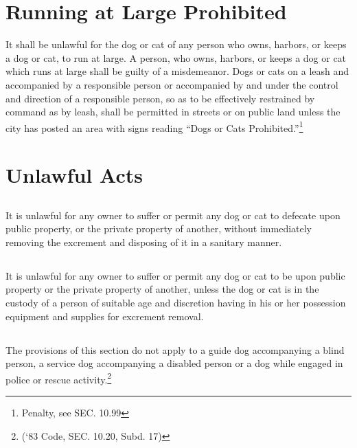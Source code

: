 \section{Running at Large Prohibited}
It shall be unlawful for the dog or cat of any person who owns, harbors, or keeps a dog or cat, to run at large.  A person, who owns, harbors, or keeps a dog or cat which runs at large shall be guilty of a misdemeanor.  Dogs or cats on a leash and accompanied by a responsible person or accompanied by and under the control and direction of a responsible person, so as to be effectively restrained by command as by leash, shall be permitted in streets or on public land unless the city has posted an area with signs reading “Dogs or Cats Prohibited.”\footnote{Penalty, see SEC. 10.99}

\section{Unlawful Acts}
\subsection{}
It is unlawful for any owner to suffer or permit any dog or cat to defecate upon public property, or the private property of another, without immediately removing the excrement and disposing of it in a sanitary manner.
\subsection{}
It is unlawful for any owner to suffer or permit any dog or cat to be upon public property or the private property of another, unless the dog or cat is in the custody of a person of suitable age and discretion having in his or her possession equipment and supplies for excrement removal.
\subsection{}
The provisions of this section do not apply to a guide dog accompanying a blind person, a service dog accompanying a disabled person or a dog while engaged in police or rescue activity.\footnote{(‘83 Code, SEC. 10.20, Subd. 17)}
